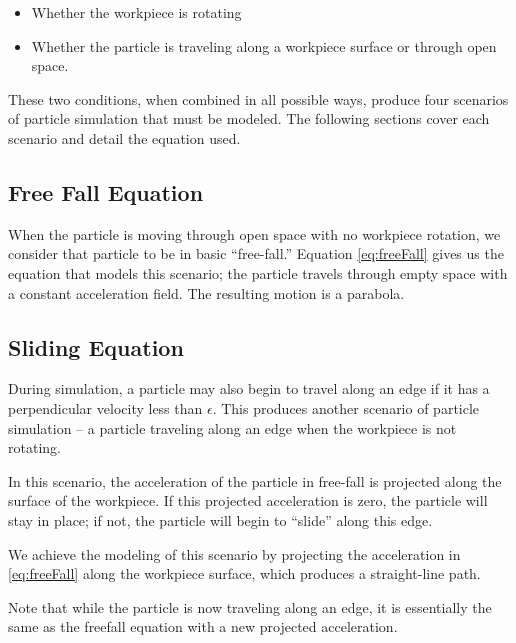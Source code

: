 \begin{itemize}
	\item Whether the workpiece is rotating
	\item Whether the particle is traveling along a workpiece surface or through open space.
\end{itemize}

These two conditions, when combined in all possible ways, produce four scenarios of particle simulation that must be modeled. The following sections cover each scenario and detail the equation used.

		\subsection{Free Fall Equation}

When the particle is moving through open space with no workpiece rotation, we consider that particle to be in basic ``free-fall.'' Equation \eqref{eq:freeFall} gives us the equation that models this scenario; the particle travels through empty space with a constant acceleration field. The resulting motion is a parabola.


		\subsection{Sliding Equation}

During simulation, a particle may also begin to travel along an edge if it has a perpendicular velocity less than $\epsilon$. This produces another scenario of particle simulation -- a particle traveling along an edge when the workpiece is not rotating.


In this scenario, the acceleration of the particle in free-fall is projected along the surface of the workpiece. If this projected acceleration is zero, the particle will stay in place; if not, the particle will begin to ``slide'' along this edge.

We achieve the modeling of this scenario by projecting the acceleration in \eqref{eq:freeFall} along the workpiece surface, which produces a straight-line path.

Note that while the particle is now traveling along an edge, it is essentially the same as the freefall equation with a new projected acceleration.


